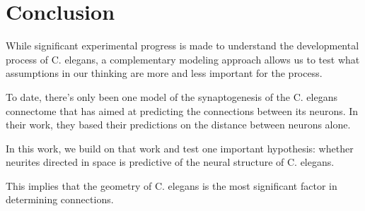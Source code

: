\section{Conclusion}

While significant experimental progress is made to understand the developmental process of C. elegans, a complementary modeling approach allows us to test what assumptions in our thinking are more and less important for the process. 

To date, there’s only been one model of the synaptogenesis of the C. elegans connectome that has aimed at predicting the connections between its neurons. In their work, they based their predictions on the distance between neurons alone. 

In this work, we build on that work and test one important hypothesis: whether neurites directed in space is predictive of the neural structure of C. elegans.

This implies that the geometry of C. elegans is the most significant factor in determining connections.